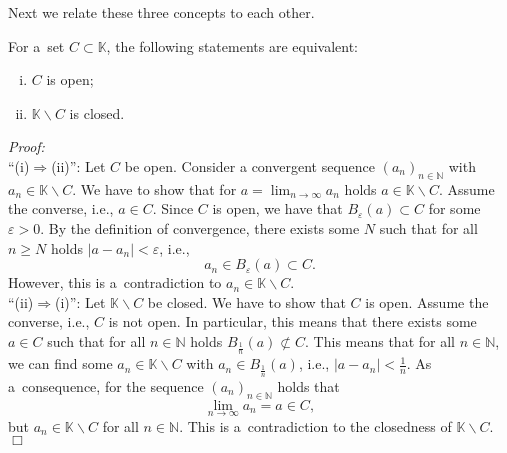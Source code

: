 Next we relate these three concepts to each other.
\begin{Theorem}{}
  For a~set $C\subset \mathbb{K}$, the following statements are equivalent:
\begin{enumerate}[(i)]
 \item $C$ is open;
 \item $\mathbb{K}\backslash C$ is closed.
\end{enumerate}
\end{Theorem}
{\em Proof:}\\
``(i)$\Rightarrow$(ii)'':
Let $C$ be open. Consider a convergent sequence $(a_{n})_{n\in\mathbb{N}}$ with $a_n\in \mathbb{K}\backslash C$. We have to show that for $a=\lim_{n\to\infty}a_n$ holds $a\in \mathbb{K}\backslash C$. Assume the converse, i.e., $a\in C$. Since $C$ is open, we have that $B_{\varepsilon}(a)\subset C$ for some $\varepsilon>0$. By the definition of convergence, there exists some $N$ such that for all $n\geq N$ holds $|a-a_n|<\varepsilon$, i.e., \[a_n\in B_{\varepsilon}(a)\subset C.\] However, this is a~contradiction to $a_n\in \mathbb{K}\backslash C$.\\

``(ii)$\Rightarrow$(i)'':
Let $\mathbb{K}\backslash C$ be closed. We have to show that $C$ is open. Assume the converse, i.e., $C$ is not open. In particular, this means that there exists some $a\in C$ such that for all $n\in\mathbb{N}$ holds $B_{\frac1n}(a)\not\subset C$. This means that for all $n\in \mathbb{N}$, we can find some $a_n\in \mathbb{K}\backslash C$ with $a_n\in B_{\frac1n}(a)$, i.e., $|a-a_n|<\frac1n$. As a~consequence, for the sequence $(a_n)_{n\in\mathbb{N}}$ holds that
\[\lim_{n\to\infty}a_n=a\in C,\]
but $a_n\in \mathbb{K}\backslash C$ for all $n\in\mathbb{N}$. This is a~contradiction to the closedness of $\mathbb{K}\backslash C$.$\Box$

